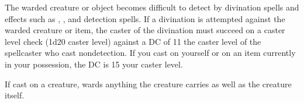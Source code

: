 \begin{spelleffect}
The warded creature or object becomes difficult to detect by divination spells and effects such as , , and detection spells. If a divination is attempted against the warded creature or item, the caster of the divination must succeed on a caster level check (1d20 \add caster level) against a DC of 11 \add the caster level of the spellcaster who cast nondetection. If you cast  on yourself or on an item currently in your possession, the DC is 15 \add your caster level.
\end{spelleffect}
\begin{spellnotes}
If cast on a creature,  wards anything the creature carries as well as the creature itself.
\end{spellnotes}

